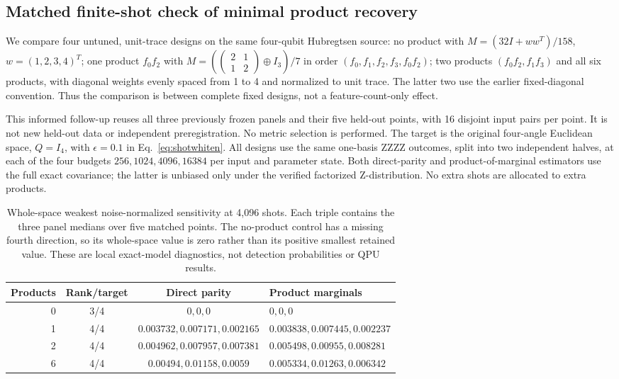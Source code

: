 \subsection{Matched finite-shot check of minimal product recovery}
\label{sec:minimalproductshots}
We compare four untuned, unit-trace designs on the same four-qubit Hubregtsen
source: no product with $M=(32I+ww^T)/158$, $w=(1,2,3,4)^T$; one product
$f_0f_2$ with $M=(\left(\begin{smallmatrix}2&1\\1&2\end{smallmatrix}\right)
\oplus I_3)/7$ in order $(f_0,f_1,f_2,f_3,f_0f_2)$; two products
$(f_0f_2,f_1f_3)$ and all six products, with diagonal weights evenly spaced
from 1 to 4 and normalized to unit trace. The latter two use the earlier
fixed-diagonal convention. Thus the comparison is between complete fixed
designs, not a feature-count-only effect.

This informed follow-up reuses all three previously frozen panels and their
five held-out points, with 16 disjoint input pairs per point. It is not new
held-out data or independent preregistration. No metric selection is performed.
The target is the original four-angle Euclidean space, $Q=I_4$, with
$\epsilon=0.1$ in Eq.~\eqref{eq:shotwhiten}. All designs use the same one-basis
ZZZZ outcomes, split into two independent halves, at each of the four budgets
$256,1024,4096,16384$ per input and parameter state. Both direct-parity and
product-of-marginal estimators use the full exact covariance; the latter is
unbiased only under the verified factorized Z-distribution. No extra shots
are allocated to extra products.

\begin{table}[htbp]
\centering
\caption{Whole-space weakest noise-normalized sensitivity at 4,096 shots.
Each triple contains the three panel medians over five matched points. The
no-product control has a missing fourth direction, so its whole-space value
is zero rather than its positive smallest retained value. These are local
exact-model diagnostics, not detection probabilities or QPU results.}
\label{tab:minimalproductshots}
\small
\begin{tabular}{@{}rccl@{}}
\toprule
Products & Rank/target & Direct parity & Product marginals\\
\midrule
0 & 3/4 & $0,0,0$ & $0,0,0$ \\
1 & 4/4 & $0.003732,0.007171,0.002165$ & $0.003838,0.007445,0.002237$ \\
2 & 4/4 & $0.004962,0.007957,0.007381$ & $0.005498,0.00955,0.008281$ \\
6 & 4/4 & $0.00494,0.01158,0.0059$ & $0.005334,0.01263,0.006342$ \\
\bottomrule
\end{tabular}
\end{table}

